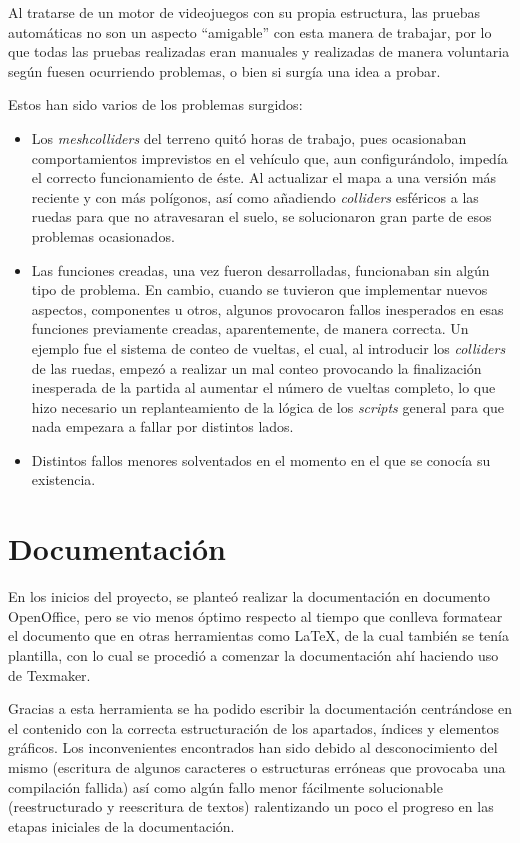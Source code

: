 Al tratarse de un motor de videojuegos con su propia estructura, las pruebas automáticas no son un aspecto ``amigable'' con esta manera de trabajar, por lo que todas las pruebas realizadas eran manuales y realizadas de manera voluntaria según fuesen ocurriendo problemas, o bien si surgía una idea a probar.

Estos han sido varios de los problemas surgidos:
\begin{itemize}
\tightlist
	\item Los \textit{meshcolliders} del terreno quitó horas de trabajo, pues ocasionaban comportamientos imprevistos en el vehículo que, aun configurándolo, impedía el correcto funcionamiento de éste. Al actualizar el mapa a una versión más reciente y con más polígonos, así como añadiendo \textit{colliders} esféricos a las ruedas para que no atravesaran el suelo, se solucionaron gran parte de esos problemas ocasionados.
	\item Las funciones creadas, una vez fueron desarrolladas, funcionaban sin algún tipo de problema. En cambio, cuando se tuvieron que implementar nuevos aspectos, componentes u otros, algunos provocaron fallos inesperados en esas funciones previamente creadas, aparentemente, de manera correcta. Un ejemplo fue el sistema de conteo de vueltas, el cual, al introducir los \textit{colliders} de las ruedas, empezó a realizar un mal conteo provocando la finalización inesperada de la partida al aumentar el número de vueltas completo, lo que hizo necesario un replanteamiento de la lógica de los \textit{scripts} general para que nada empezara a fallar por distintos lados.
	\item Distintos fallos menores solventados en el momento en el que se conocía su existencia.
\end{itemize}

\section{Documentación}

En los inicios del proyecto, se planteó realizar la documentación en documento OpenOffice, pero se vio menos óptimo respecto al tiempo que conlleva formatear el documento que en otras herramientas como LaTeX, de la cual también se tenía plantilla, con lo cual se procedió a comenzar la documentación ahí haciendo uso de Texmaker.

Gracias a esta herramienta se ha podido escribir la documentación centrándose en el contenido con la correcta estructuración de los apartados, índices y elementos gráficos. Los inconvenientes encontrados han sido debido al desconocimiento del mismo (escritura de algunos caracteres o estructuras erróneas que provocaba una compilación fallida) así como algún fallo menor fácilmente solucionable (reestructurado y reescritura de textos) ralentizando un poco el progreso en las etapas iniciales de la documentación.

